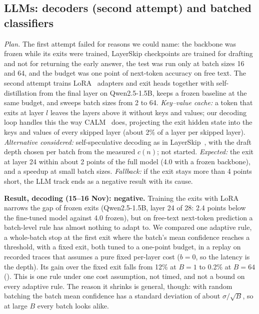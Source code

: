 \subsection{LLMs: decoders (second attempt) and batched classifiers}\label{sec:llm}
\textit{Plan.} The first attempt failed for reasons we could name: the backbone was frozen while its exits were
trained, LayerSkip checkpoints are trained for drafting and not for returning the early answer, the test was run
only at batch sizes 16 and 64, and the budget was one point of next-token accuracy on free text. The second attempt
trains LoRA~\cite{lora} adapters and exit heads together with self-distillation from the final layer on Qwen2.5-1.5B, keeps a
frozen baseline at the same budget, and sweeps batch sizes from 2 to 64. \textit{Key--value cache:} a token that
exits at layer $l$ leaves the layers above it without keys and values; our decoding loop handles this the way
CALM~\cite{calm} does, projecting the exit hidden state into the keys and values of every skipped layer (about 2\% of
a layer per skipped layer). \textit{Alternative considered:} self-speculative decoding as in
LayerSkip~\cite{layerskip}, with the draft depth chosen per batch from the measured $c(n)$; not started.
\textit{Expected:} the exit at layer 24 within about 2 points of the full model (4.0 with a frozen
backbone), and a speedup at small batch sizes. \textit{Fallback:} if the exit stays more than 4 points
short, the LLM track ends as a negative result with its cause.

\textbf{Result, decoding (15--16 Nov): negative.} Training the exits with LoRA narrows the gap of frozen exits
(Qwen2.5-1.5B, layer 24 of 28: 2.4 points below the fine-tuned model against 4.0 frozen), but on free-text
next-token prediction a batch-level rule has almost nothing to adapt to. We compared one adaptive rule, a
whole-batch stop at the first exit where the batch's mean confidence reaches a threshold, with a fixed exit, both
tuned to a one-point budget, in a replay on recorded traces that assumes a pure fixed per-layer cost ($b=0$, so the
latency is the depth). Its gain over the fixed exit falls from 12\% at $B=1$ to 0.2\% at $B=64$
(). This is one rule under one cost assumption, not timed, and not a bound
on every adaptive rule. The reason it shrinks is general, though: with random batching the batch mean confidence
has a standard deviation of about $\sigma/\sqrt{B}$, so at large $B$ every batch looks alike.


